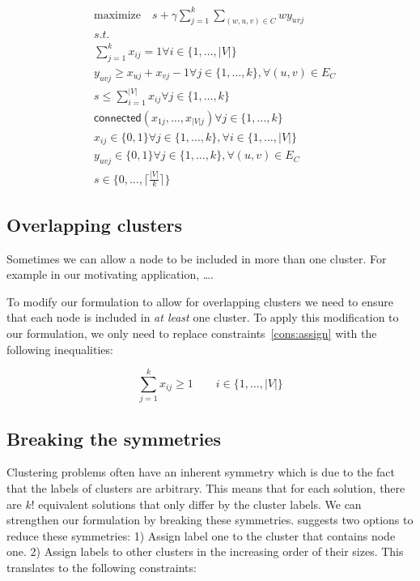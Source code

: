 \documentclass[conference,compsoc]{IEEEtran}
\begin{document}
\begin{align}
& \text{maximize} \quad s + \gamma \sum_{j=1}^{k} \sum_{(w, u, v) \in C} w  y_{uvj}  \\
&\textit{s.t.}                                                                       \nonumber \\
&\sum_{j=1}^k x_{ij} = 1                                                             \forall i \in \{1, \ldots, |V|\} \\
& y_{uvj} \geq x_{uj} + x_{vj} -1                                                    \forall j \in \{1, \ldots, k\}, \forall (u, v) \in E_{C} \\
& s \leq \sum_{i=1}^{|V|} x_{ij}                                                     \forall j \in \{1, \ldots, k\} \\
& \mathsf{connected}(x_{1j}, \ldots, x_{|V|j})                                       \forall j \in \{1, \ldots, k\} \\
& x_{ij} \in \{0, 1\}                                                                \forall j \in \{1, \ldots, k\}, \forall i \in \{1, \ldots, |V|\} \\
& y_{uvj} \in \{0, 1\}                                                               \forall j \in \{1, \ldots, k\}, \forall (u, v) \in E_{C} \\
& s \in \{0, \ldots, \lceil \frac{|V|}{k} \rceil \}                                  
\end{align}

\subsection{Overlapping clusters}
Sometimes we can allow a node to be included in more than one cluster. For example in our motivating application, \ldots. 

To modify our formulation to allow for overlapping clusters we need to ensure that each node is included in \emph{at least} one cluster. To apply this modification to our formulation, we only need to replace constraints~\ref{cons:assign} with the following inequalities:

\begin{equation}
\sum_{j=1}^{k} x_{ij} \geq 1 \qquad i \in \{1, \ldots, |V| \}
\end{equation}

\subsection{Breaking the symmetries}
Clustering problems often have an inherent symmetry which is due to the fact that the labels of clusters are arbitrary. This means that for each solution, there are $k!$ equivalent solutions that only differ by the cluster labels. We can strengthen our formulation by breaking these symmetries. \cite{SheraliD05a} suggests two options to reduce these symmetries: 1) Assign label one to the cluster that contains node one. 2) Assign labels to other clusters in the increasing order of their sizes. This translates to the following constraints:
\end{document}
